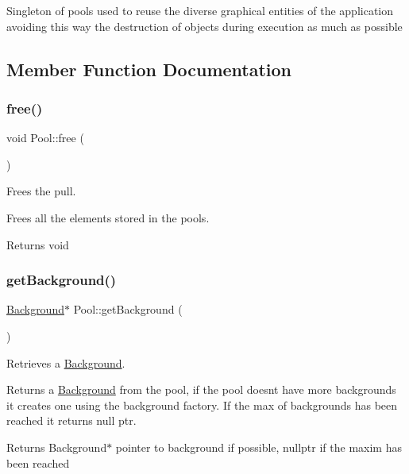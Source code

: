 Singleton of pools used to reuse the diverse graphical entities of the application avoiding this way the destruction of objects during execution as much as possible 

\subsection{Member Function Documentation}
\mbox{\label{class_pool_aa2bcc7b11c5f0a438b1fe5405ba698ff}} 
\subsubsection{\texorpdfstring{free()}{free()}}
{\footnotesize\ttfamily void Pool\+::free (\begin{DoxyParamCaption}{ }\end{DoxyParamCaption})}



Frees the pull. 

Frees all the elements stored in the pools.

\begin{DoxyReturn}{Returns}
void 
\end{DoxyReturn}
\mbox{\label{class_pool_a367c875efe93a27fea4bcaf0ed281abd}} 
\subsubsection{\texorpdfstring{get\+Background()}{getBackground()}}
{\footnotesize\ttfamily \hyperlink{class_background}{Background}$\ast$ Pool\+::get\+Background (\begin{DoxyParamCaption}{ }\end{DoxyParamCaption})}



Retrieves a \hyperlink{class_background}{Background}. 

Returns a \hyperlink{class_background}{Background} from the pool, if the pool doesn\textquotesingle{}t have more backgrounds it creates one using the background factory. If the max of backgrounds has been reached it returns null ptr.

\begin{DoxyReturn}{Returns}
Background$\ast$ pointer to background if possible, nullptr if the maxim has been reached 
\end{DoxyReturn}
\mbox{\label{class_pool_a6a45dbea615300cf7baa1c449983f9ce}} 
